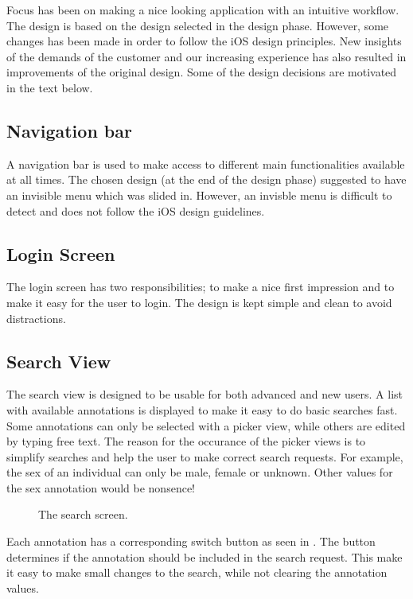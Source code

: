 Focus has been on making a nice looking application with an intuitive workflow. The design is based on the design selected in the design phase. However, some changes has been made in order to follow the iOS design principles. New insights of the demands of the customer and our increasing experience has also resulted in improvements of the original design. Some of the design decisions are motivated in the text below.


\subsection{Navigation bar}
A navigation bar is used to make access to different main functionalities available at all times. The chosen design (at the end of the design phase) suggested to have an invisible menu which was slided in. However, an invisble menu is difficult to detect and does not follow the iOS design guidelines.


\subsection{Login Screen}
The login screen has two responsibilities; to make a nice first impression and to make it easy for the user to login. The design is kept simple and clean to avoid distractions.

\subsection{Search View}
The search view is designed to be usable for both advanced and new users. A list with available annotations is displayed to make it easy to do basic searches fast. Some annotations can only be selected with a picker view, while others are edited by typing free text. The reason for the occurance of the picker views is to simplify searches and help the user to make correct search requests. For example, the sex of an individual can only be male, female or unknown. Other values for the sex annotation would be nonsence!

\begin{figure}[ht]
\caption{The search screen.}
\label{fig:ios_search2}
\end{figure}
\FloatBarrier

Each annotation has a corresponding switch button as seen in . The button determines if the annotation should be included in the search request. This make it easy to make small changes to the search, while not clearing the annotation values.

